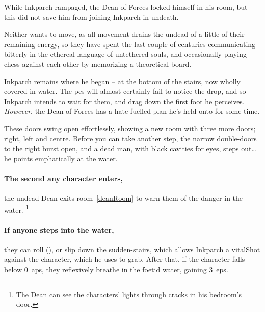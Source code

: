 
\begin{exampletext}
  While Inkparch rampaged, the Dean of Forces locked himself in his room, but this did not save him from joining Inkparch in undeath.

  Neither wants to move, as all movement drains the undead of a little of their remaining energy, so they have spent the last couple of centuries communicating bitterly in the ethereal language of untethered souls, and occasionally playing chess against each other by memorizing a theoretical board.
\end{exampletext}

Inkparch remains where he began -- at the bottom of the stairs, now wholly covered in water.
The \glspl{pc} will almost certainly fail to notice the drop, and so Inkparch intends to wait for them, and drag down the first foot he perceives.
\emph{However}, the Dean of Forces has a hate-fuelled plan he's held onto for some time.

\begin{boxtext}
  These doors swing open effortlessly, showing a new room with three more doors; right, left and centre.
  Before you can take another step, the narrow double-doors to the right burst open, and a dead man, with black cavities for eyes, steps out\ldots
  he points emphatically at the water.
\end{boxtext}

\paragraph{The second any character enters,}
the undead Dean exits room~\ref{deanRoom} to warn them of the danger in the water.%
\footnote{The Dean can see the characters' lights through cracks in his bedroom's door.}

\paragraph{If anyone steps into the water,}
they can roll  (\tn[12]), or slip down the sudden-stairs, which allows Inkparch a \gls{vitalShot} against the character, which he uses to grab.%
After that, if the character falls below 0~\glspl{ap}, they reflexively breathe in the foetid water, gaining 3~\glspl{ep}.

